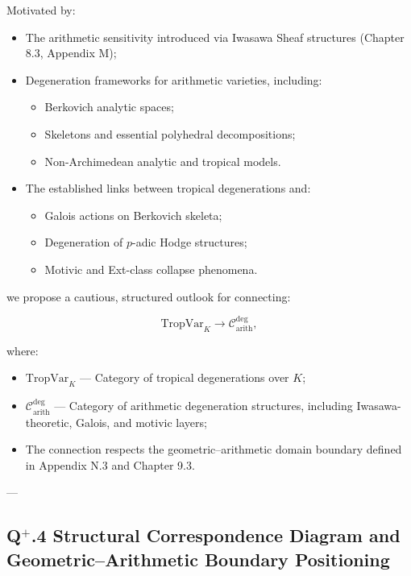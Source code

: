 \documentclass[11pt]{article}
\begin{document}
Motivated by:

\begin{itemize}
    \item The arithmetic sensitivity introduced via Iwasawa Sheaf structures (Chapter 8.3, Appendix M);
    \item Degeneration frameworks for arithmetic varieties, including:
    \begin{itemize}
        \item Berkovich analytic spaces;
        \item Skeletons and essential polyhedral decompositions;
        \item Non-Archimedean analytic and tropical models.
    \end{itemize}
    \item The established links between tropical degenerations and:
    \begin{itemize}
        \item Galois actions on Berkovich skeleta;
        \item Degeneration of $p$-adic Hodge structures;
        \item Motivic and Ext-class collapse phenomena.
    \end{itemize}
\end{itemize}

we propose a cautious, structured outlook for connecting:

\[
\mathrm{TropVar}_K \longrightarrow \mathcal{C}_{\mathrm{arith}}^{\mathrm{deg}},
\]

where:

\begin{itemize}
    \item \( \mathrm{TropVar}_K \) — Category of tropical degenerations over \( K \);
    \item \( \mathcal{C}_{\mathrm{arith}}^{\mathrm{deg}} \) — Category of arithmetic degeneration structures, including Iwasawa-theoretic, Galois, and motivic layers;
    \item The connection respects the geometric–arithmetic domain boundary defined in Appendix N.3 and Chapter 9.3.
\end{itemize}

---

\subsection*{Q$^{+}$.4 Structural Correspondence Diagram and Geometric–Arithmetic Boundary Positioning}
\end{document}
